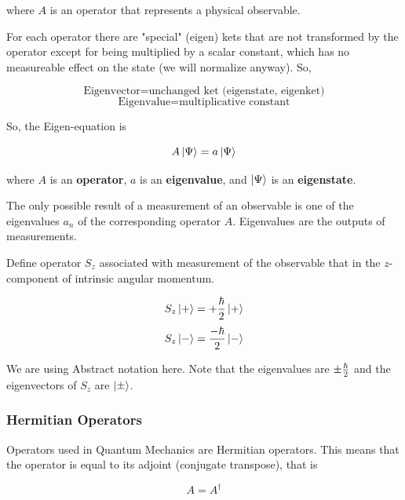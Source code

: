 \documentclass[english, 11pt]{article}
\begin{document}
        where $A$ is an operator that represents a physical observable.
        \newline

        For each operator there are "special" (eigen) kets that are not transformed by the operator except for being multiplied by a scalar constant, which has no measureable effect on the state (we will normalize anyway). So,

        \[ \mbox{Eigenvector} = \mbox{unchanged ket (eigenstate, eigenket)} \]
        \[ \mbox{Eigenvalue} = \mbox{multiplicative constant} \]

        So, the Eigen-equation is

        \[ A\left|\Psi\right\rangle = a\left|\Psi\right\rangle \]

        where $A$ is an \textbf{operator}, $a$ is an \textbf{eigenvalue}, and $\left|\Psi\right\rangle$ is an \textbf{eigenstate}.

        \begin{defn}[Postulate 3]\label{postulate_3}
          The only possible result of a measurement of an observable is one of the eigenvalues $a_n$ of the corresponding operator $A$. Eigenvalues are the outputs of measurements.
        \end{defn}

        \begin{exmp}
          Define operator $S_z$ associated with measurement of the observable that in the $z$-component of intrinsic angular momentum.

          \[ S_z \left|+\right\rangle = +\frac{\hbar}{2}\left|+\right\rangle \]
          \[ S_z \left|-\right\rangle = \frac{-\hbar}{2}\left|-\right\rangle \]

          We are using Abstract notation here. Note that the eigenvalues are $\pm \frac{\hbar}{2}$ and the eigenvectors of $S_z$ are $\left|\pm\right\rangle$.
        \end{exmp}

      \subsubsection{Hermitian Operators}

        Operators used in Quantum Mechanics are Hermitian operators. This means that the operator is equal to its adjoint (conjugate transpose), that is

        \[ A = A^\dagger \]
\end{document}
